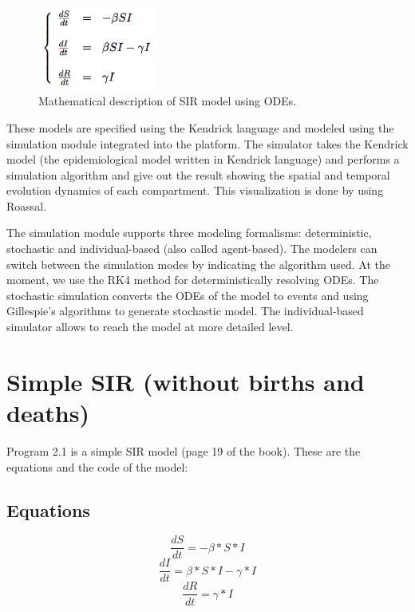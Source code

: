 \documentclass[a4paper,10pt,twoside]{book}
\begin{document}
\begin{figure}

\begin{center}
\includegraphics[width=0.35\textwidth]{figures/equation1.png}\caption{Mathematical description of SIR model using ODEs.\label{equation1}}\end{center}
\end{figure}


These models are specified using the Kendrick language and modeled using the simulation module integrated into the platform.
The simulator takes the Kendrick model (the epidemiological model written in Kendrick language) and performs a simulation algorithm and give out the result showing the spatial and temporal evolution dynamics of each compartment. This visualization is done by using Roassal.

The simulation module supports three modeling formalisms: deterministic, stochastic and individual-based (also called agent-based).
The modelers can switch between the simulation modes by indicating the algorithm used. At the moment, we use the RK4 method for deterministically resolving ODEs.
The stochastic simulation converts the ODEs of the model to events and using Gillespie's algorithms to generate stochastic model.
The individual-based simulator allows to reach the model at more detailed level.
\section{ Simple SIR (without births and deaths)}
Program 2.1 is a simple SIR model (page 19 of the book). These are the equations and the code of the model:
\subsection{ Equations}

\begin{equation}
\frac{dS}{dt} = -\beta*S*I
\end{equation}
\begin{equation}
\frac{dI}{dt} = \beta*S*I-\gamma*I
\end{equation}
\begin{equation}
\frac{dR}{dt} = \gamma*I
\end{equation}
\end{document}

